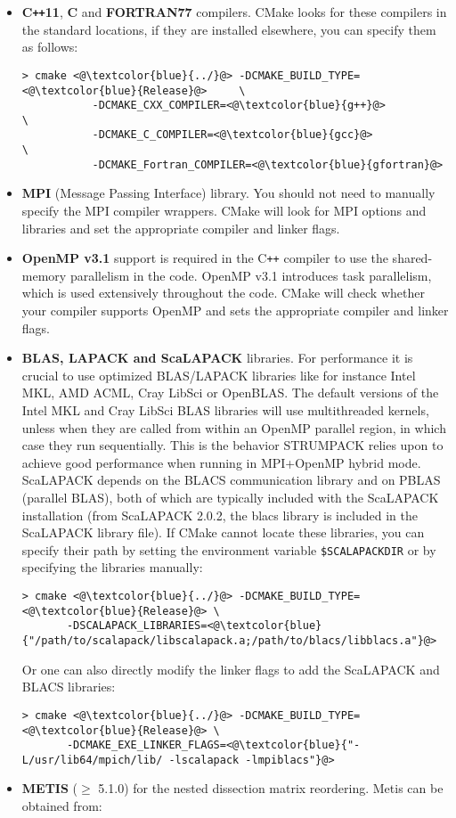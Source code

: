 \documentclass{article}
\newcommand{\tm}{\textsuperscript{\textregistered}}
\begin{document}
\begin{itemize}
\item \textbf{C\texttt{++}11}, \textbf{C} and \textbf{FORTRAN77}
  compilers. CMake looks for these compilers in the standard
  locations, if they are installed elsewhere, you can specify them as
  follows:
  \begin{lstlisting}[style=Bash]
    > cmake <@\textcolor{blue}{../}@> -DCMAKE_BUILD_TYPE=<@\textcolor{blue}{Release}@>     \
           -DCMAKE_CXX_COMPILER=<@\textcolor{blue}{g++}@>            \
           -DCMAKE_C_COMPILER=<@\textcolor{blue}{gcc}@>              \
           -DCMAKE_Fortran_COMPILER=<@\textcolor{blue}{gfortran}@>
  \end{lstlisting}
\item \textbf{MPI} (Message Passing Interface) library.  You should
  not need to manually specify the MPI compiler wrappers.  CMake will
  look for MPI options and libraries and set the appropriate compiler
  and linker flags.
\item \textbf{OpenMP v3.1} support is required in the C\texttt{++}
  compiler to use the shared-memory parallelism in the code. OpenMP
  v3.1 introduces task parallelism, which is used extensively
  throughout the code. CMake will check whether your compiler supports
  OpenMP and sets the appropriate compiler and linker flags.
\item \textbf{BLAS, LAPACK and ScaLAPACK} libraries. For performance
  it is crucial to use optimized BLAS/LAPACK libraries like for
  instance Intel\tm{} MKL, AMD\tm{} ACML, Cray\tm{} LibSci or
  OpenBLAS. The default versions of the Intel\tm{} MKL and Cray\tm{}
  LibSci BLAS libraries will use multithreaded kernels, unless when
  they are called from within an OpenMP parallel region, in which case
  they run sequentially. This is the behavior STRUMPACK relies upon to
  achieve good performance when running in MPI+OpenMP hybrid
  mode. ScaLAPACK depends on the BLACS communication library and on
  PBLAS (parallel BLAS), both of which are typically included with the
  ScaLAPACK installation (from ScaLAPACK 2.0.2, the blacs library is
  included in the ScaLAPACK library file). If CMake cannot locate
  these libraries, you can specify their path by setting the
  environment variable
  \lstinline[style=Bash]!$SCALAPACKDIR! or by specifying the libraries
  manually:
  \begin{lstlisting}[style=Bash]
    > cmake <@\textcolor{blue}{../}@> -DCMAKE_BUILD_TYPE=<@\textcolor{blue}{Release}@> \
       -DSCALAPACK_LIBRARIES=<@\textcolor{blue}{"/path/to/scalapack/libscalapack.a;/path/to/blacs/libblacs.a"}@>
  \end{lstlisting}
  Or one can also directly modify the linker flags to add the
  ScaLAPACK and BLACS libraries:
  \begin{lstlisting}[style=Bash]
    > cmake <@\textcolor{blue}{../}@> -DCMAKE_BUILD_TYPE=<@\textcolor{blue}{Release}@> \
       -DCMAKE_EXE_LINKER_FLAGS=<@\textcolor{blue}{"-L/usr/lib64/mpich/lib/ -lscalapack -lmpiblacs"}@>
  \end{lstlisting}
\item \textbf{METIS} ($\geq$ 5.1.0) for the nested dissection matrix
  reordering. Metis can be obtained from:


\end{itemize}
\end{document}
